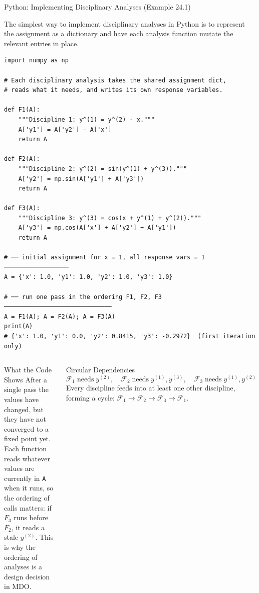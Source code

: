 \documentclass[aspectratio=169,10pt]{beamer}
\begin{document}
\begin{frame}[fragile]{Python: Implementing Disciplinary Analyses (Example 24.1)}

  The simplest way to implement disciplinary analyses in Python is to
  represent the assignment as a dictionary and have each analysis function
  mutate the relevant entries in place.

  \begin{lstlisting}[style=python]
import numpy as np

# Each disciplinary analysis takes the shared assignment dict,
# reads what it needs, and writes its own response variables.

def F1(A):
    """Discipline 1: y^(1) = y^(2) - x."""
    A['y1'] = A['y2'] - A['x']
    return A

def F2(A):
    """Discipline 2: y^(2) = sin(y^(1) + y^(3))."""
    A['y2'] = np.sin(A['y1'] + A['y3'])
    return A

def F3(A):
    """Discipline 3: y^(3) = cos(x + y^(1) + y^(2))."""
    A['y3'] = np.cos(A['x'] + A['y2'] + A['y1'])
    return A

# ── initial assignment for x = 1, all response vars = 1 ──────────────────
A = {'x': 1.0, 'y1': 1.0, 'y2': 1.0, 'y3': 1.0}

# ── run one pass in the ordering F1, F2, F3 ──────────────────────────────
A = F1(A); A = F2(A); A = F3(A)
print(A)
# {'x': 1.0, 'y1': 0.0, 'y2': 0.8415, 'y3': -0.2972}  (first iteration only)
  \end{lstlisting}

  \begin{columns}[T]
    \begin{block}{What the Code Shows}
      After a single pass the values have changed, but they have not
      converged to a fixed point yet.  Each function reads whatever values
      are currently in \texttt{A} when it runs, so the ordering of calls
      matters: if $F_3$ runs before $F_2$, it reads a stale $y^{(2)}$.
      This is why the ordering of analyses is a design decision in MDO.
    \end{block}

    \begin{block}{Circular Dependencies}
      \[
        \mathcal{F}_1 \;\text{needs}\; y^{(2)},
        \quad
        \mathcal{F}_2 \;\text{needs}\; y^{(1)}, y^{(3)},
        \quad
        \mathcal{F}_3 \;\text{needs}\; y^{(1)}, y^{(2)}
      \]
      Every discipline feeds into at least one other discipline,
      forming a cycle: $\mathcal{F}_1 \to \mathcal{F}_2 \to
      \mathcal{F}_3 \to \mathcal{F}_1$.
    \end{block}
  \end{columns}

\end{frame}
\end{document}
